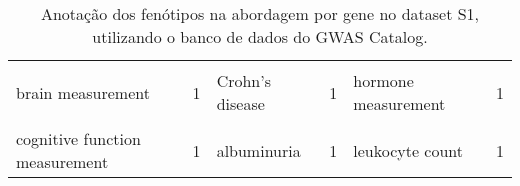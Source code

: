\begin{landscape}
\begin{table}[hp]
{\begin{tabular}[t]{lrlrlr}
\cellcolor{gray!6}{brain aneurysm} & \cellcolor{gray!6}{1} & \cellcolor{gray!6}{BMI-adjusted waist circumference} & \cellcolor{gray!6}{1} & \cellcolor{gray!6}{glomerular filtration rate} & \cellcolor{gray!6}{1}\\
brain measurement & 1 & Crohn's disease & 1 & hormone measurement & 1\\
\cellcolor{gray!6}{chronic lymphocytic leukemia} & \cellcolor{gray!6}{1} & \cellcolor{gray!6}{Eczema} & \cellcolor{gray!6}{1} & \cellcolor{gray!6}{keratinocyte carcinoma} & \cellcolor{gray!6}{1}\\
cognitive function measurement & 1 & albuminuria & 1 & leukocyte count & 1\\
\bottomrule
\end{tabular}}

\caption{Anotação dos fenótipos na abordagem por gene no dataset S1, utilizando o banco de dados do GWAS Catalog.}
\label{tab:ds1_gwas_pergene}

\end{table}
\end{landscape}
